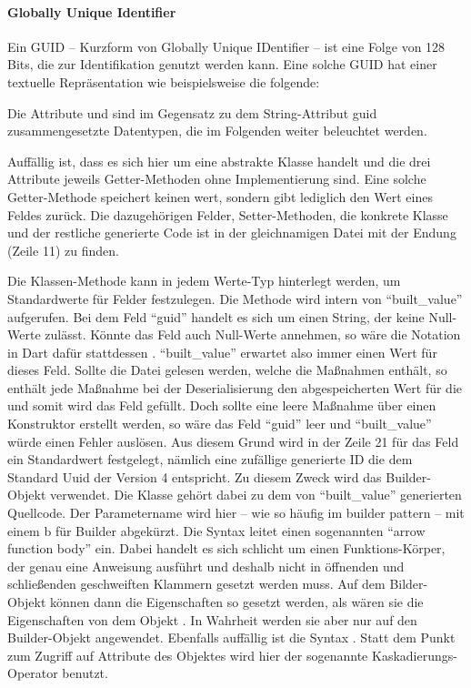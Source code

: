 \paragraph{Globally Unique Identifier} 
Ein GUID – Kurzform von Globally Unique IDentifier – ist  eine Folge von 128 Bits, die zur Identifikation genutzt werden kann. Eine solche GUID hat einer textuelle Repräsentation wie beispielsweise die folgende: 


Die Attribute  und  sind im Gegensatz zu dem String-Attribut guid zusammengesetzte Datentypen, die im Folgenden weiter beleuchtet werden.

Auffällig ist, dass es sich hier um eine abstrakte Klasse handelt und die drei Attribute jeweils Getter-Methoden ohne Implementierung sind. Eine solche Getter-Methode speichert keinen wert, sondern gibt lediglich den Wert eines Feldes zurück. Die dazugehörigen Felder,  Setter-Methoden, die konkrete Klasse und der restliche generierte Code ist in der gleichnamigen Datei mit der Endung  (Zeile 11) zu finden.

Die Klassen-Methode  kann in jedem Werte-Typ hinterlegt werden, um Standardwerte für Felder festzulegen.
Die Methode wird intern von \enquote{built_value} aufgerufen. Bei dem Feld \enquote{guid} handelt es sich um einen String, der keine Null-Werte zulässt. Könnte das Feld auch Null-Werte annehmen, so wäre die Notation in Dart dafür stattdessen . \enquote{built_value} erwartet also immer einen Wert für dieses Feld. Sollte die Datei gelesen werden, welche die Maßnahmen enthält, so enthält jede Maßnahme bei der Deserialisierung den abgespeicherten Wert für die  und somit wird das Feld gefüllt. Doch sollte eine leere Maßnahme über einen Konstruktor erstellt werden, so wäre das Feld \enquote{guid} leer und \enquote{built_value} würde einen Fehler auslösen. Aus diesem Grund wird in der Zeile 21 für das Feld  ein Standardwert festgelegt, nämlich eine zufällige generierte ID die dem Standard Uuid der Version 4 entspricht.
Zu diesem Zweck wird das Builder-Objekt verwendet. Die Klasse  gehört dabei zu dem von \enquote{built_value} generierten Quellcode. Der Parametername wird hier – wie so häufig im builder pattern – mit einem b für Builder abgekürzt. Die Syntax \IC{=>} leitet  einen sogenannten \enquote{arrow function body} ein. Dabei handelt es sich schlicht um einen Funktions-Körper, der genau eine Anweisung ausführt und deshalb nicht in öffnenden und schließenden geschweiften Klammern gesetzt werden muss. 
Auf dem Bilder-Objekt können dann die Eigenschaften so gesetzt werden, als wären sie die Eigenschaften von dem Objekt . In Wahrheit werden sie aber nur auf den Builder-Objekt angewendet.  Ebenfalls auffällig ist die Syntax .  Statt dem Punkt zum Zugriff auf Attribute des Objektes wird hier der sogenannte Kaskadierungs-Operator benutzt.

